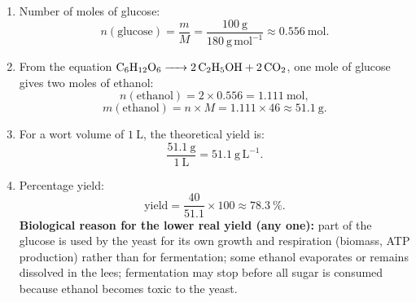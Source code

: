 \documentclass[11pt]{article}
\begin{document}
\begin{corrige}
\begin{enumerate}
\item Number of moles of glucose:
\[ n(\text{glucose}) = \frac{m}{M} = \frac{100\ \mathrm{g}}{180\ \mathrm{g\,mol^{-1}}} \approx 0.556\ \mathrm{mol}. \]
\item From the equation $\ce{C6H12O6 -> 2 C2H5OH + 2 CO2}$, one mole of glucose gives two moles of ethanol:
\[ n(\text{ethanol}) = 2 \times 0.556 = 1.111\ \mathrm{mol}, \]
\[ m(\text{ethanol}) = n \times M = 1.111 \times 46 \approx 51.1\ \mathrm{g}. \]
\item For a wort volume of $1\ \mathrm{L}$, the theoretical yield is:
\[ \frac{51.1\ \mathrm{g}}{1\ \mathrm{L}} = 51.1\ \mathrm{g\,L^{-1}}. \]
\item Percentage yield:
\[ \text{yield} = \frac{40}{51.1} \times 100 \approx 78.3\ \%. \]
\textbf{Biological reason for the lower real yield (any one):} part of the glucose is used by the yeast for its own growth and respiration (biomass, ATP production) rather than for fermentation; some ethanol evaporates or remains dissolved in the lees; fermentation may stop before all sugar is consumed because ethanol becomes toxic to the yeast.
\end{enumerate}
\end{corrige}
\end{document}
